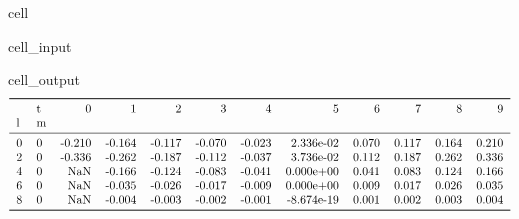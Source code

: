 \documentclass[letterpaper,table,10pt,english]{jupyterBook}
\begin{document}
\begin{sphinxuseclass}{cell}\begin{sphinxVerbatimInput}

\begin{sphinxuseclass}{cell_input}
\begin{sphinxVerbatim}[commandchars=\\\{\}]
      

  
\end{sphinxVerbatim}

\end{sphinxuseclass}\end{sphinxVerbatimInput}
\begin{sphinxVerbatimOutput}

\begin{sphinxuseclass}{cell_output}\begin{equation*}
\begin{split}\begin{tabular}{llrrrrrrrrrr}
\toprule
  & t &      0 &      1 &      2 &      3 &      4 &          5 &      6 &      7 &      8 &      9 \\
l & m &        &        &        &        &        &            &        &        &        &        \\
\midrule
0 & 0 & -0.210 & -0.164 & -0.117 & -0.070 & -0.023 &  2.336e-02 &  0.070 &  0.117 &  0.164 &  0.210 \\
2 & 0 & -0.336 & -0.262 & -0.187 & -0.112 & -0.037 &  3.736e-02 &  0.112 &  0.187 &  0.262 &  0.336 \\
4 & 0 &    NaN & -0.166 & -0.124 & -0.083 & -0.041 &  0.000e+00 &  0.041 &  0.083 &  0.124 &  0.166 \\
6 & 0 &    NaN & -0.035 & -0.026 & -0.017 & -0.009 &  0.000e+00 &  0.009 &  0.017 &  0.026 &  0.035 \\
8 & 0 &    NaN & -0.004 & -0.003 & -0.002 & -0.001 & -8.674e-19 &  0.001 &  0.002 &  0.003 &  0.004 \\
\bottomrule
\end{tabular}\end{split}
\end{equation*}
\end{sphinxuseclass}\end{sphinxVerbatimOutput}

\end{sphinxuseclass}
\end{document}
